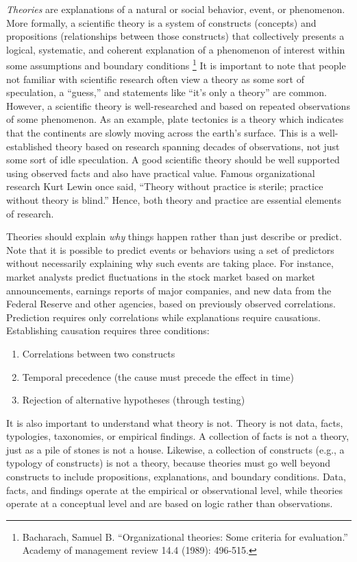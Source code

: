 \documentclass[]{book}
\providecommand{\tightlist}{%
  \setlength{\itemsep}{0pt}\setlength{\parskip}{0pt}}
\let\rmarkdownfootnote\footnote%
\def\footnote{\protect\rmarkdownfootnote}
\theoremstyle{definition}
\theoremstyle{definition}
\theoremstyle{definition}
\theoremstyle{remark}
\begin{document}
\emph{Theories} are explanations of a natural or social behavior, event,
or phenomenon. More formally, a scientific theory is a system of
constructs (concepts) and propositions (relationships between those
constructs) that collectively presents a logical, systematic, and
coherent explanation of a phenomenon of interest within some assumptions
and boundary conditions \footnote{Bacharach, Samuel B. ``Organizational
  theories: Some criteria for evaluation.'' Academy of management review
  14.4 (1989): 496-515.} It is important to note that people not
familiar with scientific research often view a theory as some sort of
speculation, a ``guess,'' and statements like ``it's only a theory'' are
common. However, a scientific theory is well-researched and based on
repeated observations of some phenomenon. As an example, plate tectonics
is a theory which indicates that the continents are slowly moving across
the earth's surface. This is a well-established theory based on research
spanning decades of observations, not just some sort of idle
speculation. A good scientific theory should be well supported using
observed facts and also have practical value. Famous organizational
research Kurt Lewin once said, ``Theory without practice is sterile;
practice without theory is blind.'' Hence, both theory and practice are
essential elements of research.

Theories should explain \emph{why} things happen rather than just
describe or predict. Note that it is possible to predict events or
behaviors using a set of predictors without necessarily explaining why
such events are taking place. For instance, market analysts predict
fluctuations in the stock market based on market announcements, earnings
reports of major companies, and new data from the Federal Reserve and
other agencies, based on previously observed correlations. Prediction
requires only correlations while explanations require causations.
Establishing causation requires three conditions:

\begin{enumerate}
\def\labelenumi{\arabic{enumi}.}
\tightlist
\item
  Correlations between two constructs
\item
  Temporal precedence (the cause must precede the effect in time)
\item
  Rejection of alternative hypotheses (through testing)
\end{enumerate}

It is also important to understand what theory is not. Theory is not
data, facts, typologies, taxonomies, or empirical findings. A collection
of facts is not a theory, just as a pile of stones is not a house.
Likewise, a collection of constructs (e.g., a typology of constructs) is
not a theory, because theories must go well beyond constructs to include
propositions, explanations, and boundary conditions. Data, facts, and
findings operate at the empirical or observational level, while theories
operate at a conceptual level and are based on logic rather than
observations.
\end{document}
